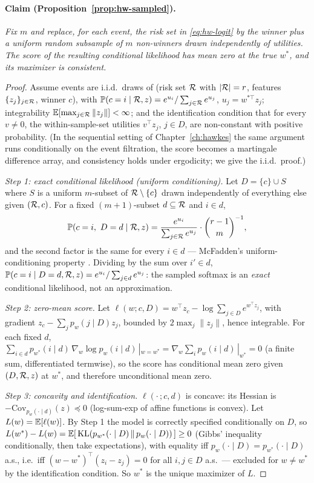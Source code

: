 \paragraph{Claim (Proposition~\ref{prop:hw-sampled}).}
\emph{Fix $m$ and replace, for each event, the risk set in \eqref{eq:hw-logit} by the winner plus a
uniform random subsample of $m$ non-winners drawn independently of utilities. The score of the
resulting conditional likelihood has mean zero at the true $w^*$, and its maximizer is consistent.}

\begin{proof}
Assume events are i.i.d.\ draws of (risk set $\mathcal{R}$ with $|\mathcal{R}| = r$, features $\{z_j\}_{j \in \mathcal{R}}$,
winner $c$), with $\mathbb{P}(c = i \mid \mathcal{R}, z) = e^{u_i}/\sum_{j \in \mathcal{R}} e^{u_j}$, $u_j = w^{*\top}
z_j$; integrability $\mathbb{E}[\max_{j \in \mathcal{R}} \|z_j\|] < \infty$; and the identification condition that
for every $v \ne 0$, the within-sample-set utilities $v^\top z_j$, $j \in D$, are non-constant with
positive probability. (In the sequential setting of Chapter~\ref{ch:hawkes} the same argument runs
conditionally on the event filtration, the score becomes a martingale difference array, and
consistency holds under ergodicity; we give the i.i.d.\ proof.)

\emph{Step 1: exact conditional likelihood (uniform conditioning).} Let $D = \{c\} \cup S$ where $S$
is a uniform $m$-subset of $\mathcal{R} \setminus \{c\}$ drawn independently of everything else given $(\mathcal{R},
c)$. For a fixed $(m{+}1)$-subset $d \subseteq \mathcal{R}$ and $i \in d$,
\[
\mathbb{P}(c = i,\ D = d \mid \mathcal{R}, z)
= \frac{e^{u_i}}{\sum_{j \in \mathcal{R}} e^{u_j}} \cdot \binom{r-1}{m}^{-1},
\]
and the second factor is the same for every $i \in d$ --- McFadden's uniform-conditioning property
\cite{mcfadden1974}. Dividing by the sum over $i' \in d$, $\mathbb{P}(c = i \mid D = d, \mathcal{R}, z) = e^{u_i}
/ \sum_{j \in d} e^{u_j}$: the sampled softmax is an \emph{exact} conditional likelihood, not an
approximation.

\emph{Step 2: zero-mean score.} Let $\ell(w; c, D) = w^\top z_c - \log \sum_{j \in D} e^{w^\top
z_j}$, with gradient $z_c - \sum_j p_w(j \mid D) z_j$, bounded by $2\max_{j}\|z_j\|$, hence
integrable. For each fixed $d$, $\sum_{i \in d} p_{w^*}(i \mid d)\, \nabla_w \log p_w(i \mid
d)\,|_{w = w^*} = \nabla_w \sum_i p_w(i \mid d)\,|_{w^*} = 0$ (a finite sum, differentiated
termwise), so the score has conditional mean zero given $(D, \mathcal{R}, z)$ at $w^*$, and therefore
unconditional mean zero.

\emph{Step 3: concavity and identification.} $\ell(\cdot\,; c, d)$ is concave: its Hessian is
$-\mathrm{Cov}_{p_w(\cdot \mid d)}(z) \preceq 0$ (log-sum-exp of affine functions is convex). Let
$L(w) = \mathbb{E}[\ell(w)]$. By Step 1 the model is correctly specified conditionally on $D$, so $L(w^*) -
L(w) = \mathbb{E}[\,\mathrm{KL}(p_{w^*}(\cdot \mid D)\, \|\, p_w(\cdot \mid D))\,] \ge 0$ (Gibbs' inequality
conditionally, then take expectations), with equality iff $p_w(\cdot \mid D) = p_{w^*}(\cdot \mid
D)$ a.s., i.e.\ iff $(w - w^*)^\top (z_i - z_j) = 0$ for all $i, j \in D$ a.s.\ --- excluded for $w
\ne w^*$ by the identification condition. So $w^*$ is the unique maximizer of $L$.


\end{proof}
